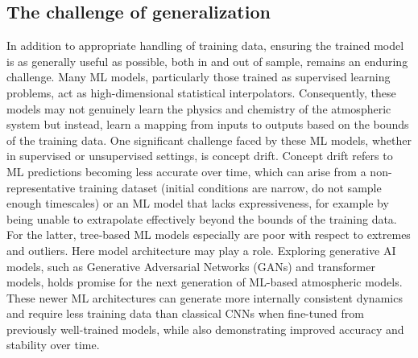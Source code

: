 \documentclass[gmd, manuscript]{copernicus}
\begin{document}

\subsection{The challenge of generalization}

In addition to appropriate handling of training data, ensuring the trained model is as generally useful as possible, both in and out of sample, remains an enduring challenge. Many ML models, particularly those trained as supervised learning problems, act as high-dimensional statistical interpolators. Consequently, these models may not genuinely learn the physics and chemistry of the atmospheric system but instead, learn a mapping from inputs to outputs based on the bounds of the training data. One significant challenge faced by these ML models, whether in supervised or unsupervised settings, is concept drift. Concept drift refers to ML predictions becoming less accurate over time, which can arise from a non-representative training dataset (initial conditions are narrow, do not sample enough timescales) or an ML model that lacks expressiveness, for example by being unable to extrapolate effectively beyond the bounds of the training data. For the latter, tree-based ML models especially are poor with respect to extremes and outliers. Here model architecture may play a role.  Exploring generative AI models, such as Generative Adversarial Networks (GANs) and transformer models, holds promise for the next generation of ML-based atmospheric models. These newer ML architectures can generate more internally consistent dynamics and require less training data than classical CNNs when fine-tuned from previously well-trained models, while also demonstrating improved accuracy and stability over time. 
\end{document}
